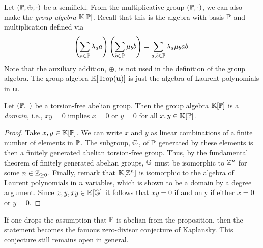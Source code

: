 Let $(\mathbb{P}, \oplus, \cdot)$ be a semifield. From the multiplicative group $(\mathbb{P},
	\cdot)$, we can also make the \emph{group algebra} $\mathbb{K}[\mathbb{P}]$.
Recall that this is the algebra with basis $\mathbb{P}$ and multiplication defined via
\begin{equation*}
	\left(\sum_{a \in \mathbb{P}} \lambda_a a\right)\left(\sum_{b \in \mathbb{P}}\mu_b b\right) = \sum_{a,b \in \mathbb{P}} \lambda_a \mu_b ab.
\end{equation*}
%
Note that the auxiliary addition, $\oplus$, is not used in the definition of the group
algebra. The group algebra $\mathbb{K}[\operatorname{Trop}(\mathbf{u})]$ is just the algebra of Laurent
polynomials in $\mathbf{u}$.
\begin{proposition}

	Let $(\mathbb{P}, \cdot)$ be a torsion-free abelian group. Then the group algebra
	$\mathbb{K}[\mathbb{P}]$ is a \emph{domain}, i.e., $x y = 0$ implies $x = 0$ or $y =
		0$ for all $x,y \in \mathbb{K}[\mathbb{P}]$.
\end{proposition}
\begin{proof}

	Take $x,y \in \mathbb{K}[\mathbb{P}]$. We can write $x$ and $y$ as linear combinations of a finite
	number of elements in $\mathbb{P}$. The subgroup, $\mathbb{G}$, of $\mathbb{P}$ generated by these
	elements is then a finitely generated abelian torsion-free group. Thus, by the
	fundamental theorem of finitely generated abelian groups, $\mathbb{G}$ must be isomorphic to
	$\mathbb{Z}^n$ for some $n \in \mathbb{Z}_{\geq 0}$. Finally, remark that $\mathbb{K}[\mathbb{Z}^n]$ is
	isomorphic to the algebra of Laurent polynomials in $n$ variables, which is shown to be a domain by a degree argument.
	Since $x,y,xy \in \mathbb{K}[\mathbb{G}]$ it follows that $xy = 0$ if and only if either $x = 0$ or
	$y = 0$.
\end{proof}

\begin{remark}

	If one drops the assumption that $\mathbb{P}$ is abelian from the proposition, then the
	statement becomes the famous zero-divisor conjecture of Kaplansky. This
	conjecture still remains open in general.
\end{remark}

